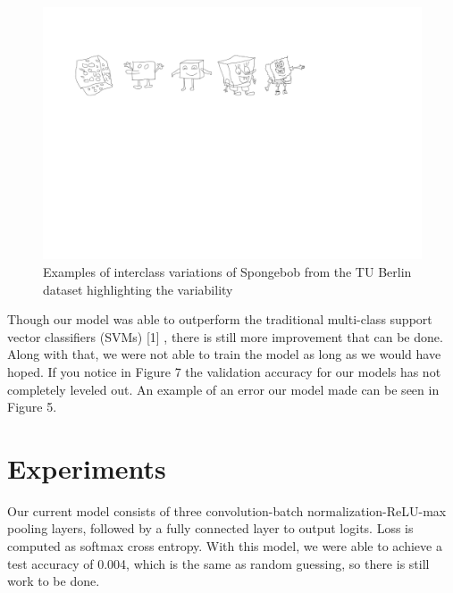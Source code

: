 \documentclass[10pt,twocolumn,letterpaper]{article}
\begin{document}
\begin{figure}[h]
	\begin{center}
	\includegraphics[width=1\linewidth]{Spondgebob}
	\caption{ Examples of interclass variations of Spongebob from the TU Berlin dataset highlighting the variability }
	\end{center}
\end{figure}


Though our model was able to outperform the traditional multi-class support vector classifiers (SVMs) [1] , there is still more improvement that can be done. Along with that, we were not able to train the model as long as we would have hoped. If you notice in Figure 7 the validation accuracy for our models has not completely leveled out. An example of an error our model made can be seen in Figure 5. 


\section{Experiments}
Our current model consists of three convolution-batch normalization-ReLU-max pooling layers, followed by a fully connected layer to output logits. Loss is computed as softmax cross entropy. With this model, we were able to achieve a test accuracy of 0.004, which is the same as random guessing, so there is still work to be done.
\end{document}
